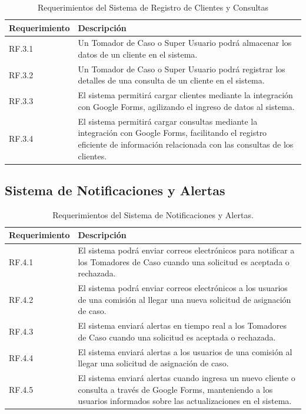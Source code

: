 \begin{table}[H]
    \centering
    \begin{tabular}{|l|p{10cm}|}
        \hline
        \textbf{Requerimiento} & \textbf{Descripción} \\
        \hline
        RF.3.1 & Un Tomador de Caso o Super Usuario podrá almacenar los datos de un cliente en el sistema. \\
        \hline
        RF.3.2 & Un Tomador de Caso o Super Usuario podrá registrar los detalles de una consulta de un cliente en el sistema. \\
        \hline
        RF.3.3 & El sistema permitirá cargar clientes mediante la integración con Google Forms, agilizando el ingreso de datos al sistema. \\
        \hline
        RF.3.4 & El sistema permitirá cargar consultas mediante la integración con Google Forms, facilitando el registro eficiente de información relacionada con las consultas de los clientes. \\
        \hline
    \end{tabular}
    \caption{Requerimientos del Sistema de Registro de Clientes y Consultas}
    \label{tab:registro-clientes-consultas}
\end{table}


\subsection{Sistema de Notificaciones y Alertas}

\begin{table}[H]
    \centering
    \begin{tabular}{|l|p{10cm}|}
        \hline
        \textbf{Requerimiento} & \textbf{Descripción} \\
        \hline
        RF.4.1 & El sistema podrá enviar correos electrónicos para notificar a los Tomadores de Caso cuando una solicitud es aceptada o rechazada. \\
        \hline
        RF.4.2 & El sistema podrá enviar correos electrónicos a los usuarios de una comisión al llegar una nueva solicitud de asignación de caso. \\
        \hline
        RF.4.3 & El sistema enviará alertas en tiempo real a los Tomadores de Caso cuando una solicitud es aceptada o rechazada. \\
        \hline
        RF.4.4 & El sistema enviará alertas a los usuarios de una comisión al llegar una solicitud de asignación de caso. \\
        \hline
        RF.4.5 & El sistema enviará alertas cuando ingresa un nuevo cliente o consulta a través de Google Forms, manteniendo a los usuarios informados sobre las actualizaciones en el sistema. \\
        \hline
    \end{tabular}
    \caption{Requerimientos del Sistema de Notificaciones y Alertas.}
    \label{tab:notificaciones-alertas}
\end{table}

